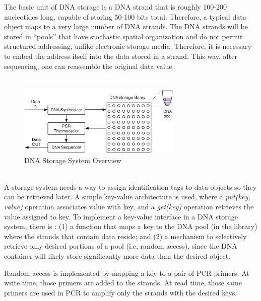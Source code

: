 The basic unit of DNA storage is a DNA strand that is roughly 100-200 nucleotides long, capable of storing 50-100
bits total. Therefore, a typical data object maps to a very large number of DNA strands. The DNA strands will be stored in
``pools'' that have stochastic spatial organization and do not permit structured addressing, unlike electronic storage media. Therefore, it is necessary to embed the address itself into the data stored in a strand. This way, after sequencing, one can reassemble the original data value.
\\ \\
\begin{figure}[h!]
    \centering
      \includegraphics[width=0.7\textwidth]{images/system-overview}
      \caption{DNA Storage System Overview}
      \label{fig:system-overview}
  \end{figure}
\\
A storage system needs a way to assign identification tags to data objects so they can be retrieved later. A simple key-value architecture is used, where a \textit{put(key, value)} operation associates value with key, and a \textit{get(key)} operation retrieves the value assigned to key. To implement a key-value interface in a DNA storage system, there is : (1) a function that maps a key to the DNA pool (in the library) where the strands that contain data reside; and (2) a mechanism to selectively retrieve only desired portions of a pool (i.e, random access), since the DNA container will likely store significantly more data than the desired object.

Random access is implemented by mapping a key to a pair of PCR primers. At write time, those primers are added to the strands. At read time, those same primers are used in PCR to amplify only the strands with the desired keys. 

